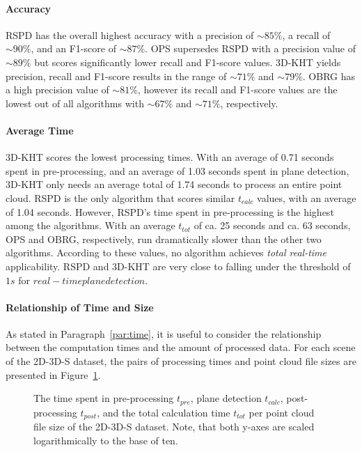 \documentclass[main.tex]{subfiles}
\begin{document}
\paragraph{Accuracy}
RSPD has the overall highest accuracy with a precision of ${\sim}85\%$, a recall of ${\sim}90\%$, and an F1-score of ${\sim}87\%$.
OPS supersedes RSPD with a precision value of ${\sim}89\%$ but scores significantly lower recall and F1-score values.
3D-KHT yields precision, recall and F1-score results in the range of ${\sim}71\%$ and ${\sim}79\%$.
OBRG has a high precision value of ${\sim}81\%$, however its recall and F1-score values are the lowest out of all algorithms
with ${\sim}67\%$ and ${\sim}71\%$, respectively.

\paragraph{Average Time }
\label{par:2D-3D-S-time}
3D-KHT scores the lowest processing times. With an average of 0.71 seconds spent in pre-processing, and an average of 1.03 seconds spent in plane detection,
3D-KHT only needs an average total of 1.74 seconds to process an entire point cloud. RSPD is the only algorithm that scores similar $t_{calc}$ values, with an
average of 1.04 seconds. However, RSPD's time spent in pre-processing is the highest among the algorithms.
With an average $t_{tot}$ of ca. 25 seconds and ca. 63 seconds, OPS and OBRG, respectively, run dramatically slower than the other two algorithms.
According to these values, no algorithm achieves \textit{total real-time} applicability. RSPD and 3D-KHT are very close
to falling under the threshold of $1s$ for $real-time plane detection$.


\paragraph{Relationship of Time and Size}
As stated in Paragraph~\ref{par:time}, it is useful to consider the relationship between the computation times and the amount of
processed data. For each scene of the 2D-3D-S dataset, the pairs of
processing times and point cloud file sizes are presented in Figure~\ref{fig:sizetimestanford}.

\begin{figure}[H]
    \centering
    \def\svgwidth{\textwidth}
    
    \caption[Time per Cloud size 2D-3D-S]{The time spent in pre-processing $t_{pre}$, plane detection $t_{calc}$, 
    post-processing $t_{post}$, and the total calculation time $t_{tot}$ per point cloud file size of the 2D-3D-S dataset. Note, that both y-axes are
        scaled logarithmically to the base of ten.}
    \label{fig:sizetimestanford}
\end{figure}
\end{document}
